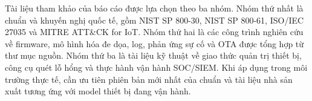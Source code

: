 \documentclass[../DoAn.tex]{subfiles}
\begin{document}
Tài liệu tham khảo của báo cáo được lựa chọn theo ba nhóm. Nhóm thứ nhất là chuẩn và khuyến nghị quốc tế, gồm NIST SP 800-30, NIST SP 800-61, ISO/IEC 27035 và MITRE ATT\&CK for IoT. Nhóm thứ hai là các công trình nghiên cứu về firmware, mô hình hóa đe dọa, log, phản ứng sự cố và OTA được tổng hợp từ thư mục nguồn. Nhóm thứ ba là tài liệu kỹ thuật về giao thức quản trị thiết bị, công cụ quét lỗ hổng và thực hành vận hành SOC/SIEM. Khi áp dụng trong môi trường thực tế, cần ưu tiên phiên bản mới nhất của chuẩn và tài liệu nhà sản xuất tương ứng với model thiết bị đang vận hành.
\end{document}
